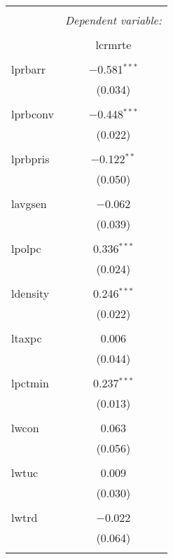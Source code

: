 
\begin{table}[!htbp] \centering 
  \caption{} 
  \label{} 
\begin{tabular}{@{\extracolsep{5pt}}lc} 
\\[-1.8ex]\hline 
\hline \\[-1.8ex] 
 & \multicolumn{1}{c}{\textit{Dependent variable:}} \\ 
\cline{2-2} 
\\[-1.8ex] & lcrmrte \\ 
\hline \\[-1.8ex] 
 lprbarr & $-$0.581$^{***}$ \\ 
  & (0.034) \\ 
  & \\ 
 lprbconv & $-$0.448$^{***}$ \\ 
  & (0.022) \\ 
  & \\ 
 lprbpris & $-$0.122$^{**}$ \\ 
  & (0.050) \\ 
  & \\ 
 lavgsen & $-$0.062 \\ 
  & (0.039) \\ 
  & \\ 
 lpolpc & 0.336$^{***}$ \\ 
  & (0.024) \\ 
  & \\ 
 ldensity & 0.246$^{***}$ \\ 
  & (0.022) \\ 
  & \\ 
 ltaxpc & 0.006 \\ 
  & (0.044) \\ 
  & \\ 
 lpctmin & 0.237$^{***}$ \\ 
  & (0.013) \\ 
  & \\ 
 lwcon & 0.063 \\ 
  & (0.056) \\ 
  & \\ 
 lwtuc & 0.009 \\ 
  & (0.030) \\ 
  & \\ 
 lwtrd & $-$0.022 \\ 
  & (0.064) \\ 
  & \\ 

\end{tabular}
\end{table}
